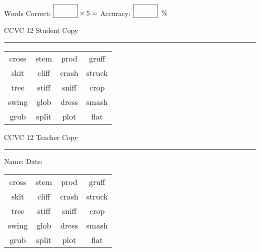 \documentclass{memoir}
\begin{document}
\small

Words Correct: $\fbox{\phantom{\huge 100}} \times 5 = $ Accuracy: $\fbox{\phantom{\huge 100}}\;\; \%$ 

\vfill

\newpage


\footnotesize \noindent
CCVC 12 \hfill Student Copy
\smallskip
\hrule

\Large

\setlength{\tabcolsep}{14pt}
\def\arraystretch{3}

{\selectfont


\begin{vplace}[0.5]
\begin{center}
\begin{tabular}{cccc}
cross & stem & prod & gruff \\
skit & cliff            & crash & struck \\
tree & stiff & sniff & crop \\
swing & glob & dress & smash \\
grub & split & plot & flat             \\
\end{tabular}
\end{center}
\end{vplace}

}

\newpage

\footnotesize \noindent
CCVC 12 \hfill Teacher Copy
\smallskip
\hrule

\small

\vfill

\noindent
Name: \underline{\hspace{1.75in}} \hfill Date: \underline{\hspace{1in}}

\Large

{\selectfont


\begin{vplace}[0.5]
\begin{center}
\begin{tabular}{cccc}
cross & stem & prod & gruff \\
skit & cliff            & crash & struck \\
tree & stiff & sniff & crop \\
swing & glob & dress & smash \\
grub & split & plot & flat             \\
\end{tabular}
\end{center}
\end{vplace}



}
\end{document}
